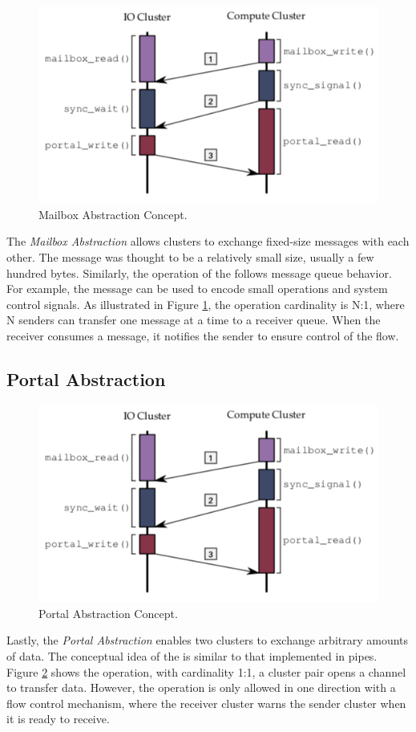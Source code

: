 			\begin{figure}[h]
				\centering
				\includegraphics[width=.7\textwidth]{images/conceptual-sync.png}

				\caption{
					Mailbox Abstraction Concept.
				}\par
				\label{fig.conpt_mailbox}
			\end{figure}

			The \textit{Mailbox Abstraction} allows clusters to exchange fixed-size
			messages with each other.
			The message was thought to be a relatively small size, usually a few hundred bytes.
			Similarly, the operation of the \mailbox follows \posix message queue behavior.
			For example, the message can be used to encode small operations and system
			control signals.
			As illustrated in Figure \ref{fig.conpt_mailbox}, the operation cardinality is N:1,
			where N senders can transfer one message at a time to a receiver queue.
			When the receiver consumes a message, it notifies the sender to ensure
			control of the flow.

		\subsection{Portal Abstraction}
		\label{sec.portal-abs}

			\begin{figure}[h]
				\centering
				\includegraphics[width=.7\textwidth]{images/conceptual-sync.png}

				\caption{
					Portal Abstraction Concept.
				}\par
				\label{fig.conpt_portal}
			\end{figure}

			Lastly, the \textit{Portal Abstraction} enables two clusters to exchange arbitrary
			amounts of data.
			The conceptual idea of ​​the \portal is similar to that implemented in \posix pipes.
			Figure \ref{fig.conpt_portal} shows the \portal operation, with cardinality
			1:1, a cluster pair opens a channel to transfer data.
			However, the operation is only allowed in one direction with a flow control mechanism,
			where the receiver cluster warns the sender cluster when it is ready to receive.
